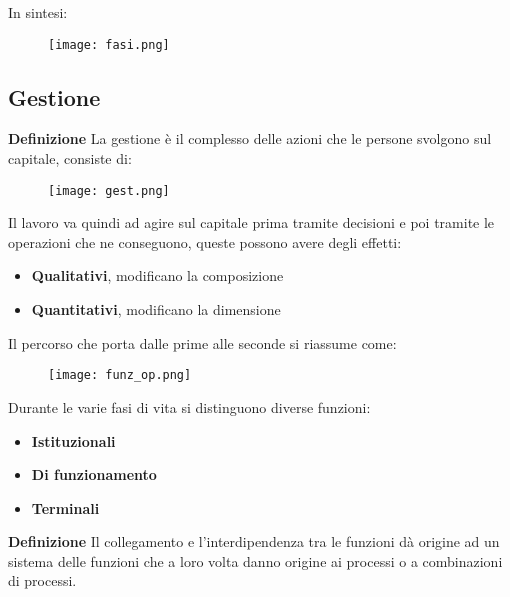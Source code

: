 \documentclass{article}
\newcommand{\df}{\noindent\textbf{Definizione }}
\begin{document}
\noindent In sintesi:

\begin{figure}[ht]
    \centering
    \texttt{[image: fasi.png]}
\end{figure}

\newpage

\subsection{Gestione}

\df La gestione è il complesso delle azioni che le persone svolgono sul capitale, consiste di:\newline

\begin{figure}[ht]
    \centering
    \texttt{[image: gest.png]}
\end{figure}

\noindent Il lavoro va quindi ad agire sul capitale prima tramite decisioni e poi tramite le operazioni che ne conseguono, queste possono avere degli effetti:
\begin{itemize}
    \item \textbf{Qualitativi}, modificano la composizione    
    \item \textbf{Quantitativi}, modificano la dimensione\newline
\end{itemize}

\noindent Il percorso che porta dalle prime alle seconde si riassume come:

\begin{figure}[ht]
    \centering
    \texttt{[image: funz\_op.png]}
\end{figure}

\noindent Durante le varie fasi di vita si distinguono diverse funzioni:
\begin{itemize}
    \item \textbf{Istituzionali}
    \item \textbf{Di funzionamento}
    \item \textbf{Terminali}\newline
\end{itemize}

\df Il collegamento e l'interdipendenza tra le funzioni dà origine ad un sistema delle funzioni che a loro volta danno origine ai processi o a combinazioni di processi.\newline
\end{document}
